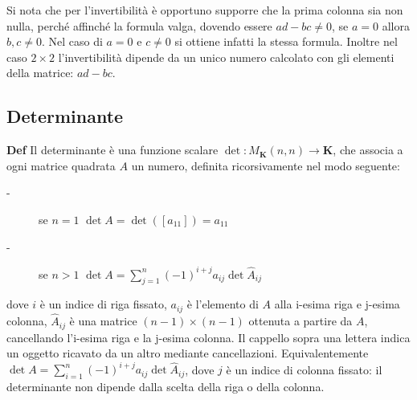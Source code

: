 \documentclass{article}
\begin{document}
Si nota che per l'invertibilit\`{a} \`{e} opportuno supporre che la prima
colonna sia non nulla, perch\'{e} affinch\'{e} la formula valga, dovendo
essere $ad-bc\neq 0$, se $a=0$ allora $b,c\neq 0$. Nel caso di $a=0$ e $%
c\neq 0$ si ottiene infatti la stessa formula. Inoltre nel caso $2\times 2$
l'invertibilit\`{a} dipende da un unico numero calcolato con gli elementi
della matrice: $ad-bc$.

\subsection{Determinante}

\textbf{Def} Il determinante \`{e} una funzione scalare $\det :M_{\mathbf{K}%
}\left( n,n\right) \rightarrow \mathbf{K}$, che associa a ogni matrice
quadrata $A$ un numero, definita ricorsivamente nel modo seguente:

\begin{description}
\item[-] se $n=1$ $\det A=\det \left( \left[ a_{11}\right] \right) =a_{11}$

\item[-] se $n>1$ $\det A=\sum_{j=1}^{n}\left( -1\right) ^{i+j}a_{ij}\det 
\hat{A}_{ij}$
\end{description}

dove $i$ \`{e} un indice di riga fissato, $a_{ij}$ \`{e} l'elemento di $A$
alla i-esima riga e j-esima colonna, $\hat{A}_{ij}$ \`{e} una matrice $%
\left( n-1\right) \times \left( n-1\right) $ ottenuta a partire da $A$,
cancellando l'i-esima riga e la j-esima colonna. Il cappello sopra una
lettera indica un oggetto ricavato da un altro mediante cancellazioni.
Equivalentemente $\det A=\sum_{i=1}^{n}\left( -1\right) ^{i+j}a_{ij}\det 
\hat{A}_{ij}$, dove $j$ \`{e} un indice di colonna fissato: il determinante
non dipende dalla scelta della riga o della colonna.
\end{document}

